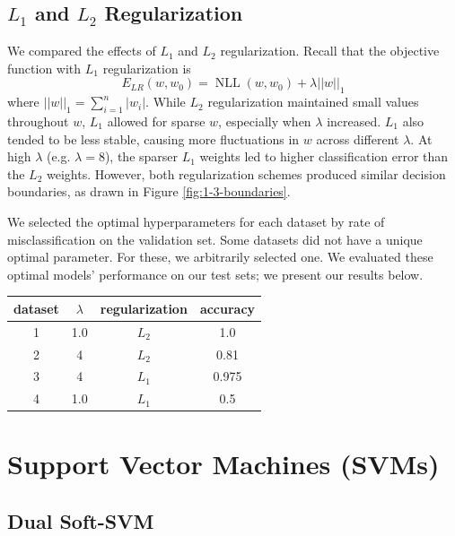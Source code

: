 \documentclass{article}
\DeclareMathOperator{\NLL}{NLL}
\begin{document}
\begin{multicols}{2}
\subsection{$L_1$ and $L_2$ Regularization}
We compared the effects of $L_1$ and $L_2$ regularization.
Recall that the objective function with $L_1$ regularization is
\begin{equation}
    E_{LR}(w, w_0) = \NLL(w, w_0) + \lambda ||w||_1
\end{equation}
where $||w||_1 = \sum_{i=1}^n{|w_i|}$. 
While $L_2$ regularization maintained small values throughout $w$, $L_1$ allowed for sparse $w$, especially when $\lambda$ increased. $L_1$ also tended to be less stable, causing more fluctuations in $w$ across different $\lambda$. At high $\lambda$ (e.g. $\lambda = 8$), the sparser $L_1$ weights led to higher classification error than the $L_2$ weights. However, both regularization schemes produced similar decision boundaries, as drawn in Figure \ref{fig:1-3-boundaries}.

We selected the optimal hyperparameters for each dataset
by rate of misclassification on the validation set.
Some datasets did not have a unique optimal parameter.
For these, we arbitrarily selected one.
We evaluated these optimal models' performance on our test sets;
we present our results below.
\begin{center}
\begin{tabular}{|c||c|c|c|}
\hline
dataset & $\lambda$	& regularization		 & accuracy \\\hline
        1	&  1.0 & $L_2$ & 1.0\\
        2	& 4 & $L_2$ & 0.81 \\
        3	& 4 & $L_1$ & 0.975 \\
        4	& 1.0 & $L_1$ & 0.5 \\\hline
\end{tabular}
\end{center}




\section{Support Vector Machines (SVMs)}
\label{sec:svm}

\subsection{Dual Soft-SVM}


\end{multicols}
\end{document}
